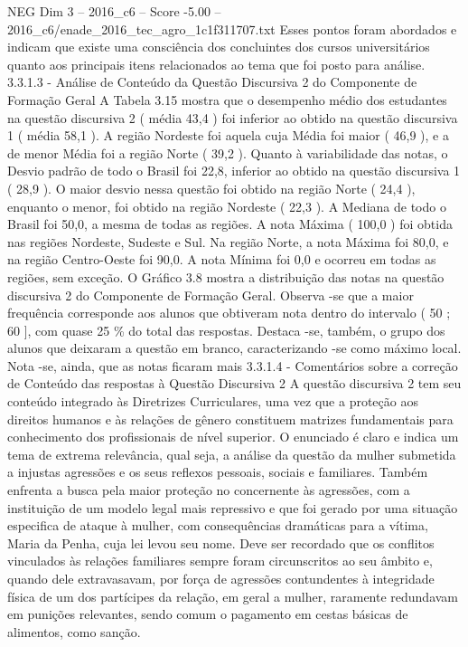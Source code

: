 \begin{textsample}{NEG Dim 3 – 2016\_c6 – Score -5.00 – 2016\_c6/enade\_2016\_tec\_agro\_1c1f311707.txt}
Esses pontos foram abordados e indicam que existe uma consciência dos concluintes dos cursos universitários quanto aos principais itens relacionados ao tema que foi posto para análise. 3.3.1.3 - Análise de Conteúdo da Questão Discursiva 2 do Componente de Formação Geral A Tabela 3.15 mostra que o desempenho médio dos estudantes na questão discursiva 2 ( média 43,4 ) foi inferior ao obtido na questão discursiva 1 ( média 58,1 ).
A região Nordeste foi aquela cuja Média foi maior ( 46,9 ), e a de menor Média foi a região Norte ( 39,2 ).
Quanto à variabilidade das notas, o Desvio padrão de todo o Brasil foi 22,8, inferior ao obtido na questão discursiva 1 ( 28,9 ).
O maior desvio nessa questão foi obtido na região Norte ( 24,4 ), enquanto o menor, foi obtido na região Nordeste ( 22,3 ).
A Mediana de todo o Brasil foi 50,0, a mesma de todas as regiões.
A nota Máxima ( 100,0 ) foi obtida nas regiões Nordeste, Sudeste e Sul.
Na região Norte, a nota Máxima foi 80,0, e na região Centro-Oeste foi 90,0.
A nota Mínima foi 0,0 e ocorreu em todas as regiões, sem exceção.
O Gráfico 3.8 mostra a distribuição das notas na questão discursiva 2 do Componente de Formação Geral.
Observa -se que a maior frequência corresponde aos alunos que obtiveram nota dentro do intervalo ( 50 ; 60 ], com quase 25 \% do total das respostas.
Destaca -se, também, o grupo dos alunos que deixaram a questão em branco, caracterizando -se como máximo local.
Nota -se, ainda, que as notas ficaram mais 3.3.1.4 - Comentários sobre a correção de Conteúdo das respostas à Questão Discursiva 2 A questão discursiva 2 tem seu conteúdo integrado às Diretrizes Curriculares, uma vez que a proteção aos direitos humanos e às relações de gênero constituem matrizes fundamentais para conhecimento dos profissionais de nível superior.
O enunciado é claro e indica um tema de extrema relevância, qual seja, a análise da questão da mulher submetida a injustas agressões e os seus reflexos pessoais, sociais e familiares.
Também enfrenta a busca pela maior proteção no concernente às agressões, com a instituição de um modelo legal mais repressivo e que foi gerado por uma situação especifica de ataque à mulher, com consequências dramáticas para a vítima, Maria da Penha, cuja lei levou seu nome.
Deve ser recordado que os conflitos vinculados às relações familiares sempre foram circunscritos ao seu âmbito e, quando dele extravasavam, por força de agressões contundentes à integridade física de um dos partícipes da relação, em geral a mulher, raramente redundavam em punições relevantes, sendo comum o pagamento em cestas básicas de alimentos, como sanção.

\end{textsample}

